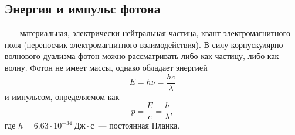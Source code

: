 \subsection{Энергия и импульс фотона}
~--- материальная, электрически нейтральная частица, квант электромагнитного поля (переносчик электромагнитного взаимодействия). В силу корпускулярно-волнового дуализма фотон можно рассматривать либо как частицу, либо как волну. Фотон не имеет массы, однако обладает энергией
\begin{equation}
	E = h \nu = \frac{h c}{\lambda}
\end{equation}
и импульсом, определяемом как
\begin{equation}
	p = \frac{E}{c} = \frac{h}{\lambda},
\end{equation}
где $h = 6.63 \cdot 10^{-34}~\text{Дж}\cdot\text{с}$~---  постоянная Планка.